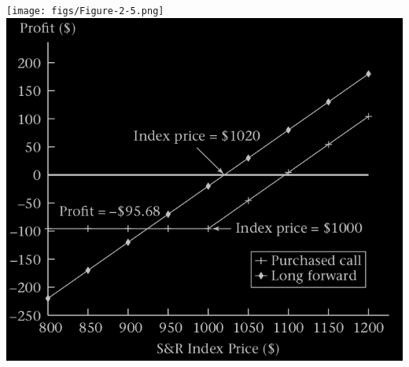 \begin{frame}[fragile]
\begin{center}
	\texttt{[image: figs/Figure-2-5.png]}\hfill
	\includegraphics[scale=0.2]{figs/Figure-2-6.png}
\end{center}
\end{frame}
